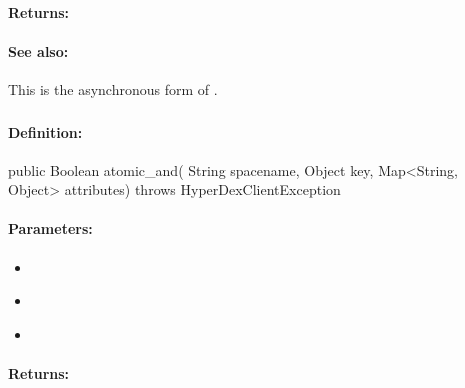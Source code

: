 \paragraph{Returns:}


\paragraph{See also:}  This is the asynchronous form of .

\pagebreak
\subsubsection{}
\label{api:java:atomic_and}


\paragraph{Definition:}
\begin{javacode}
public Boolean atomic_and(
        String spacename,
        Object key,
        Map<String, Object> attributes) throws HyperDexClientException
\end{javacode}

\paragraph{Parameters:}
\begin{itemize}[noitemsep]
\item {}\\

\item {}\\

\item {}\\

\end{itemize}

\paragraph{Returns:}


